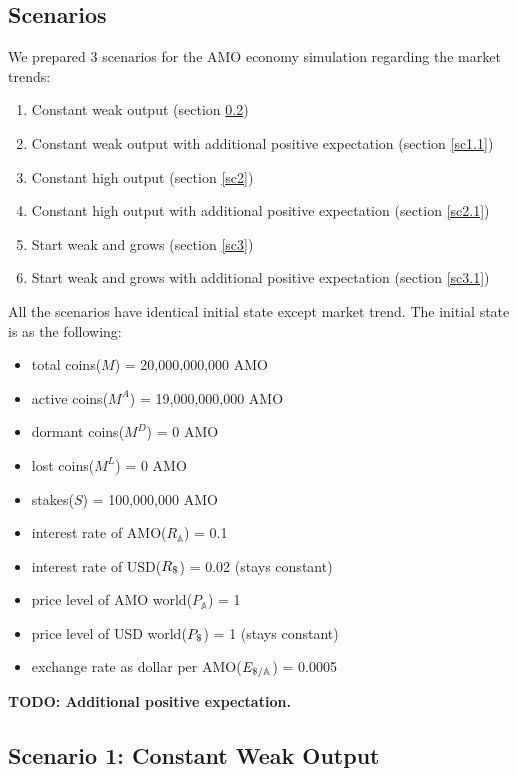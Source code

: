 \documentclass[a4paper,11pt]{scrartcl}
\newcommand{\usd}{\text{\textdollar}}
\newcommand{\amom}{\mathbb{A}}
\begin{document}
\subsection{Scenarios}
We prepared 3 scenarios for the AMO economy simulation regarding the market
trends:
\begin{enumerate}
	\item{Constant weak output} (section \ref{sc1})
	\item{Constant weak output with additional positive expectation} (section \ref{sc1.1})
	\item{Constant high output} (section \ref{sc2})
	\item{Constant high output with additional positive expectation} (section \ref{sc2.1})
	\item{Start weak and grows} (section \ref{sc3})
	\item{Start weak and grows with additional positive expectation} (section \ref{sc3.1})
\end{enumerate}
All the scenarios have identical initial state except market trend. The initial
state is as the following:
\begin{itemize}
	\item{total coins($M$) = 20,000,000,000 AMO}
	\item{active coins($M^A$) = 19,000,000,000 AMO}
	\item{dormant coins($M^D$) = 0 AMO}
	\item{lost coins($M^L$) = 0 AMO}
	\item{stakes($S$) = 100,000,000 AMO}
	\item{interest rate of AMO($R_\amom$) = 0.1}
	\item{interest rate of USD($R_\usd$) = 0.02 (stays constant)}
	\item{price level of AMO world($P_\amom$) = 1}
	\item{price level of USD world($P_\usd$) = 1 (stays constant)}
	\item{exchange rate as dollar per AMO($E_{\usd/\amom}$) = 0.0005}
\end{itemize}

\textbf{TODO: Additional positive expectation.}

\subsection{Scenario 1: Constant Weak Output}
\label{sc1}
\end{document}
